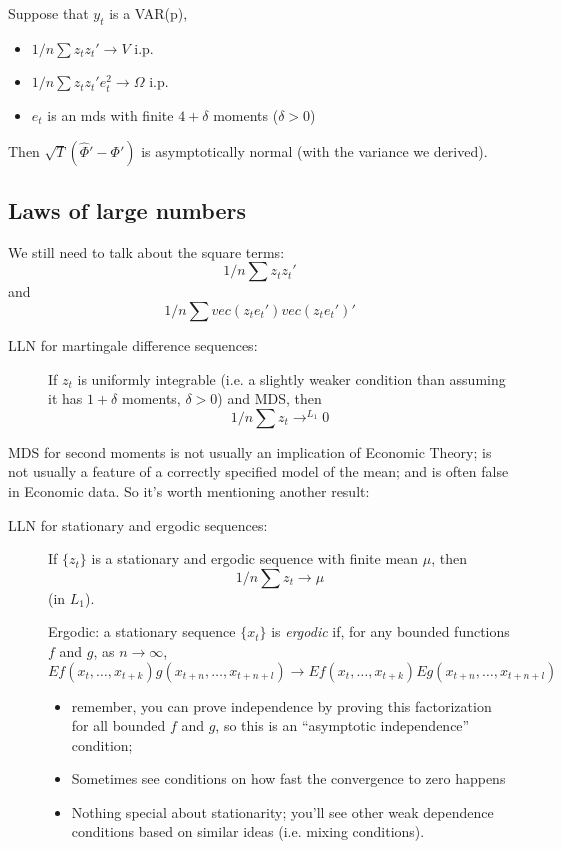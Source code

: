 Suppose that $y_t$ is a VAR(p),
\begin{itemize}
\item $1/n \sum z_t z_t' \to V$ i.p.
\item $1/n \sum z_t z_t' e_t^2 \to \Omega$ i.p.
\item $e_t$ is an mds with finite $4 + \delta$ moments ($\delta > 0$)
\end{itemize}
Then $\sqrt{T} ( \hat \Phi' - \Phi' )$ is asymptotically normal (with the
variance we derived).

\subsection{Laws of large numbers}
We still need to talk about the square terms:
\[1/n \sum z_t z_t'\]
and
\[1/n \sum vec( z_t e_t' ) vec( z_t e_t' )'\]
\begin{description}
\item[LLN for martingale difference sequences:]
If $z_t$ is uniformly integrable (i.e. a slightly weaker condition than
assuming it has $1 + \delta$ moments, $\delta > 0$) and MDS, then
\[1/n \sum z_t \to^{L_1} 0\]
\end{description}

MDS for second moments is not usually an implication of Economic
Theory; is not usually a feature of a correctly specified model of the
mean; and is often false in Economic data. So it's worth mentioning
another result:

\begin{description}
\item[LLN for stationary and ergodic sequences:]

  If $\{z_t\}$ is a stationary and ergodic sequence with finite mean
  $\mu$, then
  \[1/n \sum z_t \to \mu\] (in $L_1$).

  Ergodic: a stationary sequence $\{x_t\}$ is \emph{ergodic} if, for
  any bounded functions $f$ and $g$, as $n \to \infty$,
  \[E f( x_t, \dots, x_{t + k}) g(x_{t + n}, \dots, x_{ t + n + l} ) \to E f(
  x_t, \dots, x_{ t + k } ) E g(x_{ t + n }, \dots, x_{ t + n + l} )\]

  \begin{itemize}
  \item remember, you can prove independence by proving this
    factorization for all bounded $f$ and $g$, so this is an ``asymptotic
    independence'' condition;
  \item Sometimes see conditions on how fast the convergence to zero
    happens
  \item Nothing special about stationarity; you'll see other weak
    dependence conditions based on similar ideas (i.e. mixing
    conditions).
  \end{itemize}
\end{description}


